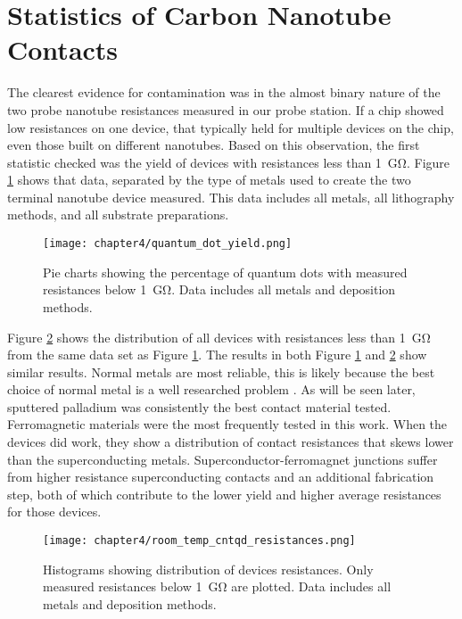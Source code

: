 \section{Statistics of Carbon Nanotube Contacts}

The clearest evidence for contamination was in the almost binary nature of the two probe nanotube resistances measured in our probe station. If a chip showed low resistances on one device, that typically held for multiple devices on the chip, even those built on different nanotubes. Based on this observation, the first statistic checked was the yield of devices with resistances less than \SI{1}{\giga\ohm}. Figure \ref{fig:quantum_dot_yield} shows that data, separated by the type of metals used to create the two terminal nanotube device measured. This data includes all metals, all lithography methods, and all substrate preparations.

\begin{figure}
    \centering
    \texttt{[image: chapter4/quantum\_dot\_yield.png]}
    \caption{Pie charts showing the percentage of quantum dots with measured resistances below \SI{1}{\giga\ohm}. Data includes all metals and deposition methods.}
    \label{fig:quantum_dot_yield}
\end{figure}

Figure \ref{fig:rt_resistances} shows the distribution of all devices with resistances less than \SI{1}{\giga\ohm} from the same data set as Figure \ref{fig:quantum_dot_yield}. The results in both Figure \ref{fig:quantum_dot_yield} and \ref{fig:rt_resistances} show similar results. Normal metals are most reliable, this is likely because the best choice of normal metal is a well researched problem \cite{Javey2003, Song2011, Kane2011}. As will be seen later, sputtered palladium was consistently the best contact material tested. Ferromagnetic materials were the most frequently tested in this work. When the devices did work, they show a distribution of contact resistances that skews lower than the superconducting metals. Superconductor-ferromagnet junctions suffer from higher resistance superconducting contacts and an additional fabrication step, both of which contribute to the lower yield and higher average resistances for those devices.

\begin{figure}
    \centering
    \texttt{[image: chapter4/room\_temp\_cntqd\_resistances.png]}
    \caption{Histograms showing distribution of devices resistances. Only measured resistances below \SI{1}{\giga\ohm} are plotted. Data includes all metals and deposition methods.}
    \label{fig:rt_resistances}
\end{figure}

